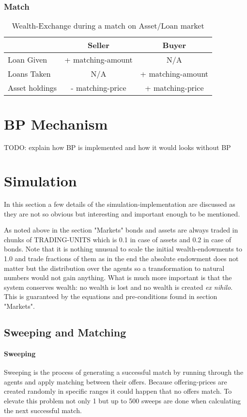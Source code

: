 \documentclass[Bachelorarbeit.tex]{subfiles}
\begin{document}
\subsubsection{Match}

\begin{table}[H]
	\centering
	\caption{Wealth-Exchange during a match on Asset/Loan market}
	\begin{tabular} { l c c }
		& Seller & Buyer \\
		\hline
		Loan Given & + matching-amount & N/A \\
		Loans Taken & N/A & + matching-amount \\
		Asset holdings & - matching-price & + matching-price \\
		\hline
	\end{tabular}
\end{table}

\section{BP Mechanism}
TODO: explain how BP is implemented and how it would looks without BP

\section{Simulation}
In this section a few details of the simulation-implementation are discussed as they are not so obvious but interesting and important enough to be mentioned.

\medskip

As noted above in the section "Markets" bonds and assets are always traded in chunks of TRADING-UNITS which is 0.1 in case of assets and 0.2 in case of bonds. Note that it is nothing unusual to scale the initial wealth-endowments to 1.0 and trade fractions of them as in the end the absolute endowment does not matter but the distribution over the agents so a transformation to natural numbers would not gain anything. What is much more important is that the system conserves wealth: no wealth is lost and no wealth is created \textit{ex nihilo}. This is guaranteed by the equations and pre-conditions found in section "Markets". 

\subsection{Sweeping and Matching}
\label{sec:implementation_sweepingAndMatching}

\paragraph{Sweeping}
Sweeping is the process of generating a successful match by running through the agents and apply matching between their offers. Because offering-prices are created randomly in specific ranges it could happen that no offers match. To elevate this problem not only 1 but up to 500 sweeps are done when calculating the next successful match.
\end{document}
